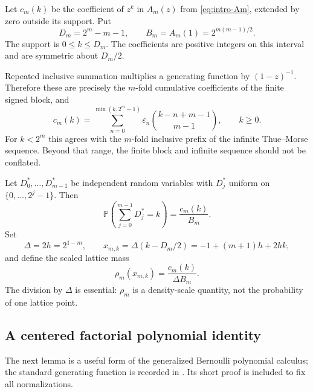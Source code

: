 \documentclass[11pt,a4paper]{article}
\numberwithin{equation}{section}
\theoremstyle{definition}
\newcommand{\Prob}{\mathbb P}
\newcommand{\eps}{\varepsilon}
\begin{document}
Let $c_m(k)$ be the coefficient of $z^k$ in $A_m(z)$ from
\eqref{eq:intro-Am}, extended by zero outside its support. Put
\begin{equation}
 D_m=2^m-m-1,\qquad B_m=A_m(1)=2^{m(m-1)/2}.
 \label{eq:DB}
\end{equation}
The support is $0\leq k\leq D_m$. The coefficients are positive
integers on this interval and are symmetric about $D_m/2$.

Repeated inclusive summation multiplies a generating function by
$(1-z)^{-1}$. Therefore these are precisely the $m$-fold cumulative
coefficients of the finite signed block, and
\begin{equation}
 c_m(k)=\sum_{n=0}^{\min(k,2^m-1)}
            \eps_n\binom{k-n+m-1}{m-1},\qquad k\geq0.
 \label{eq:c-binomial}
\end{equation}
For $k<2^m$ this agrees with the $m$-fold inclusive prefix of the
infinite Thue--Morse sequence. Beyond that range, the finite block
and infinite sequence should not be conflated.

Let $D_0^*,\ldots,D_{m-1}^*$ be independent random variables with
$D_j^*$ uniform on $\{0,\ldots,2^j-1\}$. Then
\begin{equation}
 \Prob\left(\sum_{j=0}^{m-1}D_j^*=k\right)=\frac{c_m(k)}{B_m}.
 \label{eq:c-probability}
\end{equation}
Set
\begin{equation}
 \Delta=2h=2^{1-m},\qquad
 x_{m,k}=\Delta(k-D_m/2)=-1+(m+1)h+2hk,
 \label{eq:lattice-nodes}
\end{equation}
and define the scaled lattice mass
\begin{equation}
 \rho_m(x_{m,k})=\frac{c_m(k)}{\Delta B_m}.
 \label{eq:rho}
\end{equation}
The division by $\Delta$ is essential: $\rho_m$ is a density-scale
quantity, not the probability of one lattice point.

\subsection{A centered factorial polynomial identity}

The next lemma is a useful form of the generalized Bernoulli
polynomial calculus; the standard generating function is recorded in
\cite{dlmf}. Its short proof is included to fix all normalizations.
\end{document}
